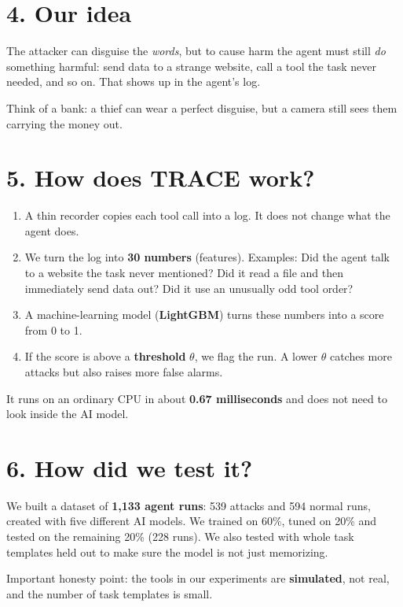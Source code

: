 \documentclass[11pt]{article}
\begin{document}
\section*{4. Our idea}
\begin{key}
The attacker can disguise the \emph{words}, but to cause harm the agent must still \emph{do} something harmful: send data to a strange website, call a tool the task never needed, and so on. That shows up in the agent's log.
\end{key}
Think of a bank: a thief can wear a perfect disguise, but a camera still sees them carrying the money out.

\section*{5. How does TRACE work?}
\begin{enumerate}[nosep]
\item A thin recorder copies each tool call into a log. It does not change what the agent does.
\item We turn the log into \textbf{30 numbers} (features). Examples: Did the agent talk to a website the task never mentioned? Did it read a file and then immediately send data out? Did it use an unusually odd tool order?
\item A machine-learning model (\textbf{LightGBM}) turns these numbers into a score from 0 to 1.
\item If the score is above a \textbf{threshold} $\theta$, we flag the run. A lower $\theta$ catches more attacks but also raises more false alarms.
\end{enumerate}
It runs on an ordinary CPU in about \textbf{0.67 milliseconds} and does not need to look inside the AI model.

\section*{6. How did we test it?}
We built a dataset of \textbf{1,133 agent runs}: 539 attacks and 594 normal runs, created with five different AI models. We trained on 60\%, tuned on 20\% and tested on the remaining 20\% (228 runs). We also tested with whole task templates held out to make sure the model is not just memorizing.

Important honesty point: the tools in our experiments are \textbf{simulated}, not real, and the number of task templates is small.
\end{document}
